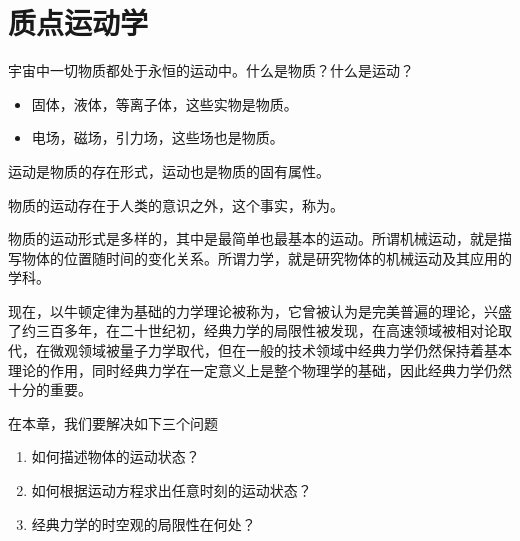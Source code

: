 \chapter{质点运动学}

宇宙中一切物质都处于永恒的运动中。什么是物质？什么是运动？
\begin{itemize}
    \item 固体，液体，等离子体，这些实物是物质。
    \item 电场，磁场，引力场，这些场也是物质。
\end{itemize}
运动是物质的存在形式，运动也是物质的固有属性。

物质的运动存在于人类的意识之外，这个事实，称为。

物质的运动形式是多样的，其中是最简单也最基本的运动。所谓机械运动，就是描写物体的位置随时间的变化关系。所谓力学，就是研究物体的机械运动及其应用的学科。

现在，以牛顿定律为基础的力学理论被称为，它曾被认为是完美普遍的理论，兴盛了约三百多年，在二十世纪初，经典力学的局限性被发现，在高速领域被相对论取代，在微观领域被量子力学取代，但在一般的技术领域中经典力学仍然保持着基本理论的作用，同时经典力学在一定意义上是整个物理学的基础，因此经典力学仍然十分的重要。

在本章，我们要解决如下三个问题
\begin{enumerate}
    \item 如何描述物体的运动状态？
    \item 如何根据运动方程求出任意时刻的运动状态？
    \item 经典力学的时空观的局限性在何处？
\end{enumerate}



